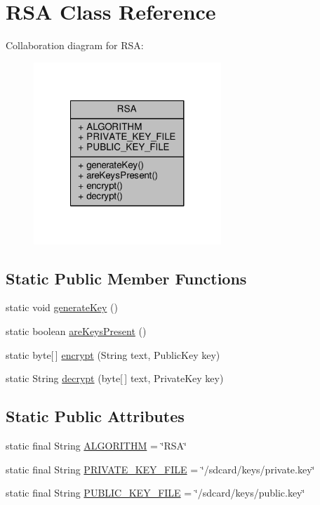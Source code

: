 \hypertarget{a00014}{\section{R\+S\+A Class Reference}
\label{a00014}
}


Collaboration diagram for R\+S\+A\+:
\nopagebreak
\begin{figure}[H]
\begin{center}
\leavevmode
\includegraphics[width=200pt]{a00076}
\end{center}
\end{figure}
\subsection*{Static Public Member Functions}
\begin{DoxyCompactItemize}
\item 
static void \hyperlink{a00014_a7e50cd7fa3c4f3a6817d292ca95aeb62}{generate\+Key} ()
\item 
static boolean \hyperlink{a00014_a35798da976b0b93c5a41d3cacfca2614}{are\+Keys\+Present} ()
\item 
static byte\mbox{[}$\,$\mbox{]} \hyperlink{a00014_aebcb755cdb5b80fbc7e5550d4ef7b58c}{encrypt} (String text, Public\+Key key)
\item 
static String \hyperlink{a00014_af45813b997c833a4aa7c740f24da405d}{decrypt} (byte\mbox{[}$\,$\mbox{]} text, Private\+Key key)
\end{DoxyCompactItemize}
\subsection*{Static Public Attributes}
\begin{DoxyCompactItemize}
\item 
static final String \hyperlink{a00014_a6e0d720a4420fd9bfd6749e43727e4cf}{A\+L\+G\+O\+R\+I\+T\+H\+M} = \char`\"{}R\+S\+A\char`\"{}
\item 
static final String \hyperlink{a00014_a6688acc9715053feb655fd1179f44ca2}{P\+R\+I\+V\+A\+T\+E\+\_\+\+K\+E\+Y\+\_\+\+F\+I\+L\+E} = \char`\"{}/sdcard/keys/private.\+key\char`\"{}
\item 
static final String \hyperlink{a00014_a9512d79dcc02d4b61268f7118479185d}{P\+U\+B\+L\+I\+C\+\_\+\+K\+E\+Y\+\_\+\+F\+I\+L\+E} = \char`\"{}/sdcard/keys/public.\+key\char`\"{}
\end{DoxyCompactItemize}


